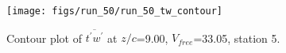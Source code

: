 \begin{figure}[H]
\centering
\texttt{[image: figs/run\_50/run\_50\_tw\_contour]}
\caption{Contour plot of $\overline{t^\prime w^\prime}$ at $z/c$=9.00, $V_{free}$=33.05, station 5.}
\label{fig:run_50_tw_contour}
\end{figure}


